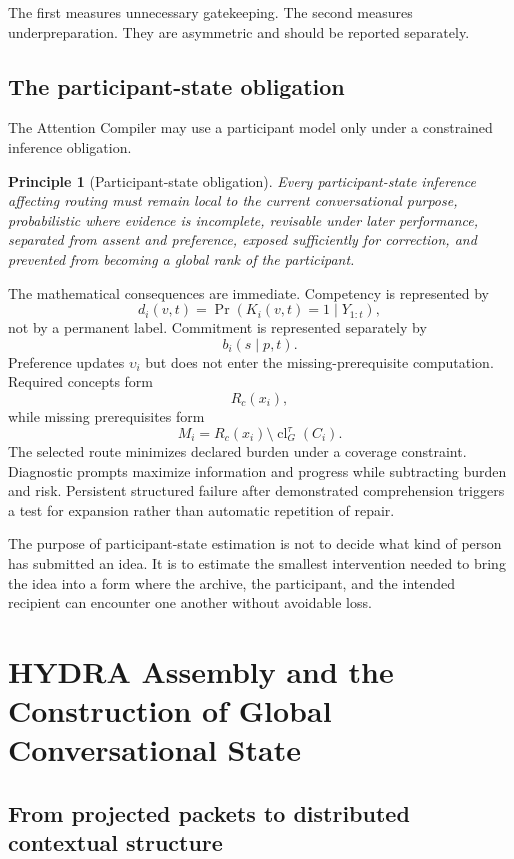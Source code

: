 \documentclass[11pt]{article}
\newtheorem{principle}[definition]{Principle}
\theoremstyle{definition}
\DeclareMathOperator{\Prob}{Pr}
\DeclareMathOperator{\closure}{cl}
\begin{document}
The first measures unnecessary gatekeeping. The second measures underpreparation. They are asymmetric and should be reported separately.

\subsection{The participant-state obligation}

The Attention Compiler may use a participant model only under a constrained inference obligation.

\begin{principle}[Participant-state obligation]
Every participant-state inference affecting routing must remain local to the current conversational purpose, probabilistic where evidence is incomplete, revisable under later performance, separated from assent and preference, exposed sufficiently for correction, and prevented from becoming a global rank of the participant.
\end{principle}

The mathematical consequences are immediate. Competency is represented by
\[
d_i(v,t)
=
\Prob(K_i(v,t)=1\mid Y_{1:t}),
\]
not by a permanent label. Commitment is represented separately by
\[
b_i(s\mid p,t).
\]
Preference updates \(\upsilon_i\) but does not enter the missing-prerequisite computation. Required concepts form
\[
R_c(x_i),
\]
while missing prerequisites form
\[
M_i
=
R_c(x_i)
\setminus
\closure_G^\tau(C_i).
\]
The selected route minimizes declared burden under a coverage constraint. Diagnostic prompts maximize information and progress while subtracting burden and risk. Persistent structured failure after demonstrated comprehension triggers a test for expansion rather than automatic repetition of repair.

The purpose of participant-state estimation is not to decide what kind of person has submitted an idea. It is to estimate the smallest intervention needed to bring the idea into a form where the archive, the participant, and the intended recipient can encounter one another without avoidable loss.

\section{HYDRA Assembly and the Construction of Global Conversational State}

\subsection{From projected packets to distributed contextual structure}
\end{document}
